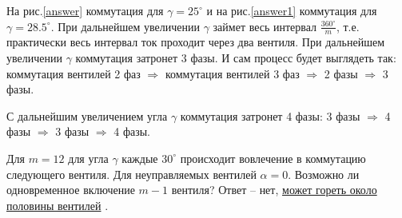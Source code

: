 \documentclass{article}
\begin{document}
На рис.\ref{answer} коммутация для $\gamma=25^\circ$ и на рис.\ref{answer1} коммутация для $\gamma=28.5^\circ$.
 При дальнейшем увеличении $\gamma$ займет весь интервал ${\displaystyle \frac{360^\circ}{m}}$, т.е. практически весь интервал ток проходит через два вентиля.
 При дальнейшем увеличении $\gamma$ коммутация затронет 3 фазы. И сам процесс будет выглядеть так: коммутация вентилей 2 фаз $\Rightarrow$ коммутация вентилей 3 фаз $\Rightarrow$ 2 фазы $\Rightarrow$ 3 фазы.

 С дальнейшим увеличением угла $\gamma$ коммутация затронет 4 фазы: 3 фазы $\Rightarrow$ 4 фазы $\Rightarrow$ 3 фазы $\Rightarrow$ 4 фазы.

 Для $m=12$ для угла $\gamma$ каждые $30^\circ$ происходит вовлечение в коммутацию следующего вентиля. Для неуправляемых вентилей $\alpha=0$. Возможно ли одновременное включение $m-1$ вентиля? Ответ -- нет,
 \href{http://e-heritage.ru/ras/view/publication/general.html?id=48315927}{может гореть около половины вентилей} \cite{KNB}. 
 
\end{document}
